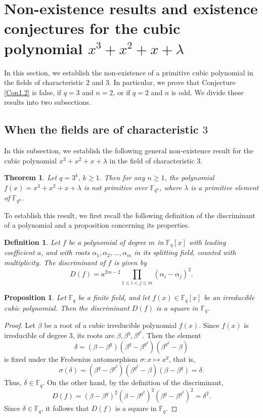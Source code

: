 \documentclass[preprint,12pt]{elsarticle}
\newtheorem{theorem}{Theorem}[section]
\newtheorem{de}{Definition}[section]
\newtheorem{prop}{Proposition}[section]
\begin{document}
\section{Non-existence results and existence conjectures for the cubic polynomial $x^3+x^2+x+\lambda$ }\label{S3}

    In this section, we establish the non-existence of a primitive cubic polynomial in the fields of characteristic $2$ and $3$. In particular, we prove that Conjecture \ref{Con1.2} is false, if $q=3$ and $n=2$, or if $q=2$ and $n$ is odd. We divide these results into two subsections.

\subsection{When the fields are of characteristic $3$}
    

    In this subsection, we establish the following general non-existence result for the cubic polynomial $x^3+x^2+x+\lambda$ in the field of characteristic $3$.

    \begin{theorem}\label{T3.1}
        Let $q=3^k,\, k\geq 1$. Then for any $n\geq 1$, the polynomial $f(x)=x^3+x^2+x+\lambda$ is not primitive over $\mathbb{F}_{q^n}$, where $\lambda$ is a primitive element of  $\mathbb{F}_{q^n}$.  
    \end{theorem}

   To establish this result, we first recall the following definition of the discriminant of a polynomial and a proposition concerning its properties.

    \begin{de}\label{D3.1}
    Let $f$ be a polynomial of degree $m$ in $\mathbb{F}_q[x]$ with leading coefficient $a$, and with roots $\alpha_1,\alpha_2,\ldots,\alpha_m$ in its splitting field, counted with multiplicity. The discriminant of $f$ is given by
    $$D(f)=a^{2m-2}\prod_{1\leq i<j\leq m}(\alpha_i-\alpha_j)^2.$$
\end{de}

\begin{prop}\label{P3.1}
    Let $\mathbb{F}_{q}$ be a finite field, and let $f(x)\in \mathbb{F}_{q}[x]$ be an irreducible cubic polynomial. Then the discriminant $D(f)$ is a square in $\mathbb{F}_{q}$.
\end{prop}
\begin{proof}
    Let $\beta$ be a root of a cubic irreducible polynomial $f(x)$. Since $f(x)$ is irreducible of degree $3$, its roots are $\beta,\beta^q,\beta^{q^2}$. Then the element 
    $$\delta=(\beta-\beta^{q})(\beta^{q}-\beta^{q^2})(\beta^{{q^2}}-\beta)$$
    is fixed under the Frobenius automorphism $\sigma:x\mapsto x^q$, that is, 
    $$\sigma(\delta)=(\beta^{q}-\beta^{{q^2}})(\beta^{{q^2}}-\beta)(\beta-\beta^{q})=\delta.$$ 
    Thus, $\delta\in \mathbb{F}_{q}$. On the other hand, by the definition of the discriminant, $$D(f)=(\beta-\beta^{q})^2(\beta-\beta^{{q^2}})^2(\beta^{{q}}-\beta^{q^2})^2=\delta^2.$$ Since $\delta\in \mathbb{F}_{q}$, it follows that $D(f)$ is a square in $\mathbb{F}_{q}$.
\end{proof}
\end{document}
